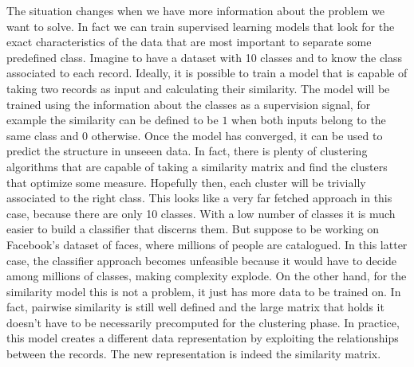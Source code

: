 The situation changes when we have more information about the problem we want to solve. In fact we can train supervised learning models that look for the exact characteristics of the data that are most important to separate some predefined class. Imagine to have a dataset with 10 classes and to know the class associated to each record. Ideally, it is possible to train a model that is capable of taking two records as input and calculating their similarity. The model will be trained using the information about the classes as a supervision signal, for example the similarity can be defined to be $1$ when both inputs belong to the same class and $0$ otherwise. Once the model has converged, it can be used to predict the structure in unseeen data. In fact, there is plenty of clustering algorithms that are capable of taking a similarity matrix and find the clusters that optimize some measure. Hopefully then, each cluster will be trivially associated to the right class. This looks like a very far fetched approach in this case, because there are only 10 classes. With a low number of classes it is much easier to build a classifier that discerns them. But suppose to be working on Facebook's dataset of faces, where millions of people are catalogued. In this latter case, the classifier approach becomes unfeasible because it would have to decide among millions of classes, making complexity explode. On the other hand, for the similarity model this is not a problem, it just has more data to be trained on. In fact, pairwise similarity is still well defined and the large matrix that holds it doesn't have to be necessarily precomputed for the clustering phase. In practice, this model creates a different data representation by exploiting the relationships between the records. The new representation is indeed the similarity matrix.
